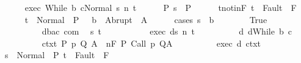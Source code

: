 \begin{isabellebody}
\ \ \ \ \isamarkupfalse%
\ exec{\isacharcolon}\ {\isachardoublequoteopen}{\isasymGamma}{\isasymturnstile}{\isasymlangle}While\ b\ c{\isacharcomma}Normal\ s{\isasymrangle}\ {\isacharequal}n{\isasymRightarrow}\ t{\isachardoublequoteclose}\isanewline
\ \ \ \ \isamarkupfalse%
\ P{\isacharcolon}\ {\isachardoublequoteopen}s\ {\isasymin}\ P{\isachardoublequoteclose}\isanewline
\ \ \ \ \isamarkupfalse%
\ t{\isacharunderscore}notin{\isacharunderscore}F{\isacharcolon}\ {\isachardoublequoteopen}t\ {\isasymnotin}\ Fault\ {\isacharbackquote}\ F{\isachardoublequoteclose}\ \isanewline
\ \ \ \ \isamarkupfalse%
\ {\isachardoublequoteopen}t\ {\isasymin}\ Normal\ {\isacharbackquote}\ {\isacharparenleft}P\ {\isasyminter}\ {\isacharminus}\ b{\isacharparenright}\ {\isasymunion}\ Abrupt\ {\isacharbackquote}\ A{\isachardoublequoteclose}\isanewline
\ \ \ \ \isamarkupfalse%
\ {\isacharparenleft}cases\ {\isachardoublequoteopen}s\ {\isasymin}\ b{\isachardoublequoteclose}{\isacharparenright}\isanewline
\ \ \ \ \ \ \isamarkupfalse%
\ True\isanewline
\ \ \ \ \ \ \isacommand{{\isacharbraceleft}}\isamarkupfalse%
\isanewline
\ \ \ \ \ \ \ \ \isamarkupfalse%
\ d{\isacharcolon}{\isacharcolon}{\isachardoublequoteopen}{\isacharparenleft}{\isacharprime}b{\isacharcomma}{\isacharprime}a{\isacharcomma}{\isacharprime}c{\isacharparenright}\ com{\isachardoublequoteclose}\ \isamarkupfalse%
\ s\ t\ \isanewline
\ \ \ \ \ \ \ \ \isamarkupfalse%
\ exec{\isacharcolon}\ {\isachardoublequoteopen}{\isasymGamma}{\isasymturnstile}{\isasymlangle}d{\isacharcomma}s{\isasymrangle}\ {\isacharequal}n{\isasymRightarrow}\ t{\isachardoublequoteclose}\isanewline
\ \ \ \ \ \ \ \ \isamarkupfalse%
\ d{\isacharcolon}\ {\isachardoublequoteopen}d{\isacharequal}While\ b\ c{\isachardoublequoteclose}\isanewline
\ \ \ \ \ \ \ \ \isamarkupfalse%
\ ctxt{\isacharcolon}\ {\isachardoublequoteopen}{\isasymforall}{\isacharparenleft}P{\isacharcomma}\ p{\isacharcomma}\ Q{\isacharcomma}\ A{\isacharparenright}{\isasymin}{\isasymTheta}{\isachardot}\ {\isasymGamma}\ {\isasymTurnstile}n{\isacharcolon}\isactrlbsub {\isacharslash}F\isactrlesub \ P\ {\isacharparenleft}Call\ p{\isacharparenright}\ Q{\isacharcomma}A{\isachardoublequoteclose}\isanewline
\ \ \ \ \ \ \ \ \isamarkupfalse%
\ exec\ d\ ctxt\isanewline
\ \ \ \ \ \ \ \ \isamarkupfalse%
\ {\isachardoublequoteopen}{\isasymlbrakk}s\ {\isasymin}\ Normal\ {\isacharbackquote}\ P{\isacharsemicolon}\ t\ {\isasymnotin}\ Fault\ {\isacharbackquote}\ F{\isasymrbrakk}\isanewline

\end{isabellebody}
